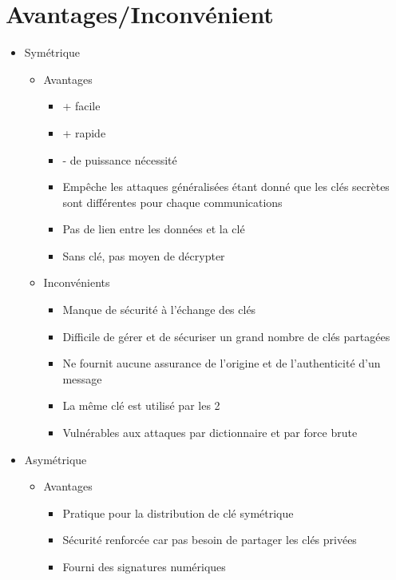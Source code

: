 \documentclass[a4paper]{article}
\begin{document}
\section{Avantages/Inconvénient}
\begin{itemize}[label=\textbullet, font=\Large]
    \item Symétrique
    \begin{itemize}[label=, font=\scriptsize]
        \item Avantages
        \begin{itemize}
            \item + facile
            \item + rapide
            \item - de puissance nécessité
            \item Empêche les attaques généralisées étant donné que les clés secrètes sont différentes pour chaque communications
            \item Pas de lien entre les données et la clé
            \item Sans clé, pas moyen de décrypter
        \end{itemize}
        \item Inconvénients
        \begin{itemize}
            \item Manque de sécurité à l'échange des clés
            \item Difficile de gérer et de sécuriser un grand nombre de clés partagées
            \item Ne fournit aucune assurance de l'origine et de l'authenticité d'un message
            \item La même clé est utilisé par les 2
            \item Vulnérables aux attaques par dictionnaire et par force brute
        \end{itemize}
    \end{itemize}
    \item Asymétrique
    \begin{itemize}[label=, font=\scriptsize]
        \item Avantages
        \begin{itemize}
            \item Pratique pour la distribution de clé symétrique
            \item Sécurité renforcée car pas besoin de partager les clés privées
            \item Fourni des signatures numériques

\end{itemize}
\end{itemize}
\end{itemize}
\end{document}
